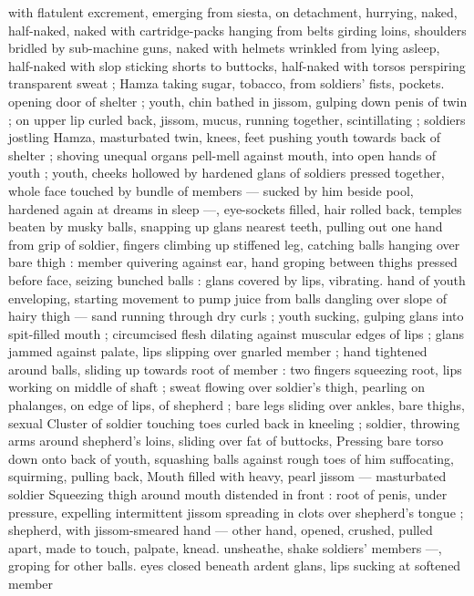 with flatulent excrement, emerging from siesta, on detachment, 
hurrying, naked, half-naked, naked with cartridge-packs hanging 
from belts girding loins, shoulders bridled by sub-machine guns, 
naked with helmets wrinkled from lying asleep, half-naked with slop 
sticking shorts to buttocks, half-naked with torsos perspiring 
transparent sweat ; Hamza taking sugar, tobacco, from soldiers' fists, 
pockets. opening door of shelter ; youth, chin bathed in jissom, 
gulping down penis of twin ; on upper lip curled back, jissom, mucus, 
running together, scintillating ; soldiers jostling Hamza, masturbated 
twin, knees, feet pushing youth towards back of shelter ; shoving 
unequal organs pell-mell against mouth, into open hands of youth ; 
youth, cheeks hollowed by hardened glans of soldiers pressed 
together, whole face touched by bundle of members --- sucked by 
him beside pool, hardened again at dreams in sleep ---, eye-sockets 
filled, hair rolled back, temples beaten by musky balls, snapping up 
glans nearest teeth, pulling out one hand from grip of soldier, fingers 
climbing up stiffened leg, catching balls hanging over bare thigh : 
member quivering against ear, hand groping between thighs pressed 
before face, seizing bunched balls : glans covered by lips, vibrating. 
hand of youth enveloping, starting movement to pump juice from 
balls dangling over slope of hairy thigh --- sand running through dry 
curls ; youth sucking, gulping glans into spit-filled mouth ; 
circumcised flesh dilating against muscular edges of lips ; glans 
jammed against palate, lips slipping over gnarled member ; hand 
tightened around balls, sliding up towards root of member : two 
fingers squeezing root, lips working on middle of shaft ; sweat 
flowing over soldier's thigh, pearling on phalanges, on edge of lips, 
of shepherd ; bare legs sliding over ankles, bare thighs, sexual 
Cluster of soldier touching toes curled back in kneeling ; soldier, 
throwing arms around shepherd's loins, sliding over fat of buttocks, 
Pressing bare torso down onto back of youth, squashing balls 
against rough toes of him suffocating, squirming, pulling back, 
Mouth filled with heavy, pearl jissom --- masturbated soldier 
Squeezing thigh around mouth distended in front : root of penis, 
under pressure, expelling intermittent jissom spreading in clots over 
shepherd's tongue ; shepherd, with jissom-smeared hand --- other 
hand, opened, crushed, pulled apart, made to touch, palpate, knead. 
unsheathe, shake soldiers' members ---, groping for other balls. 
eyes closed beneath ardent glans, lips sucking at softened member 
